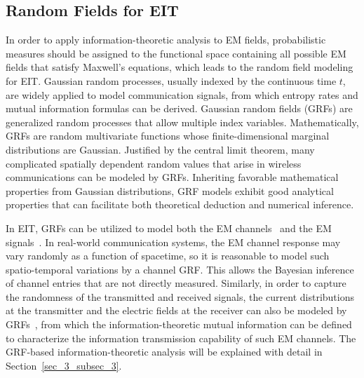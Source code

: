 \documentclass[journal,twocolumn]{IEEEtran}
\begin{document}
\subsection{Random Fields for EIT}
\label{Sec_2_Subsec_4}
In order to apply information-theoretic analysis to EM fields, probabilistic measures should be assigned to the functional space containing all possible EM fields that satisfy Maxwell's equations, which leads to the random field modeling for EIT. 
Gaussian random processes, usually indexed by the continuous time $t$, are widely applied to model communication signals, from which entropy rates and mutual information formulas can be derived. Gaussian random fields (GRFs) are generalized random processes that allow multiple index variables. Mathematically, GRFs are random multivariate functions whose finite-dimensional marginal distributions are Gaussian. Justified by the central limit theorem, many complicated spatially dependent random values that arise in wireless communications can be modeled by GRFs.  
Inheriting favorable mathematical properties from Gaussian distributions, GRF models exhibit good analytical properties that can facilitate both theoretical deduction and numerical inference. 

In EIT, GRFs can be utilized to model both the EM channels~\cite{marzetta2022fourier} and the EM signals~\cite{wan2022mutual}. 
In real-world communication systems, the EM channel response may vary randomly as a function of spacetime, so it is reasonable to model such spatio-temporal variations by a channel GRF. 
This allows the Bayesian inference of channel entries that are not directly measured. 
Similarly, in order to capture the randomness of the transmitted and received signals, the current distributions at the transmitter and the electric fields at the receiver can also be modeled by GRFs~\cite{wan2022mutual}, from which the information-theoretic mutual information can be defined to characterize the information transmission capability of such EM channels. The GRF-based information-theoretic analysis will be explained with detail in Section~\ref{sec_3_subsec_3}. 

\end{document}
